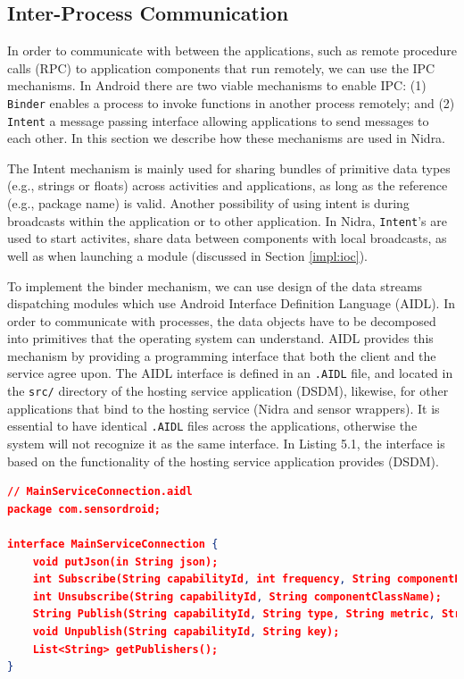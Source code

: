 \subsection{Inter-Process Communication}\label{implement:aidl}
In order to communicate with between the applications, such as remote procedure calls (RPC) to application components that run remotely, we can use the IPC mechanisms. In Android there are two viable mechanisms to enable IPC: (1) \verb|Binder| enables a process to invoke functions in another process remotely; and (2) \verb|Intent| a message passing interface allowing applications to send messages to each other. In this section we describe how these mechanisms are used in Nidra.

The Intent mechanism is mainly used for sharing bundles of primitive data types (e.g., strings or floats) across activities and applications, as long as the reference (e.g., package name) is valid. Another possibility of using intent is during broadcasts within the application or to other application. In Nidra, \verb|Intent|'s are used to start activites, share data between components with local broadcasts, as well as when launching a module (discussed in Section \ref{impl:ioc}).

To implement the binder mechanism, we can use design of the data streams dispatching modules which use Android Interface Definition Language (AIDL). In order to communicate with processes, the data objects have to be decomposed into primitives that the operating system can understand. AIDL provides this mechanism by providing a programming interface that both the client and the service agree upon. The AIDL interface is defined in an \verb|.AIDL| file, and located in the \verb|src/| directory of the hosting service application (DSDM), likewise, for other applications that bind to the hosting service (Nidra and sensor wrappers). It is essential to have identical \verb|.AIDL| files across the applications, otherwise the system will not recognize it as the same interface. In Listing 5.1, the interface is based on the functionality of the hosting service application provides (DSDM). 

\begin{lstlisting}[language=json, caption={An interface provided by the host service (i.e., DSDM) that provides functionality other applications can use (e.g., Nidra and sensor wrappers)}, captionpos=b]
// MainServiceConnection.aidl
package com.sensordroid;

interface MainServiceConnection {
    void putJson(in String json);
    int Subscribe(String capabilityId, int frequency, String componentPackageName, String componentClassName);
    int Unsubscribe(String capabilityId, String componentClassName);
    String Publish(String capabilityId, String type, String metric, String description);
    void Unpublish(String capabilityId, String key);
    List<String> getPublishers();
}
\end{lstlisting}

